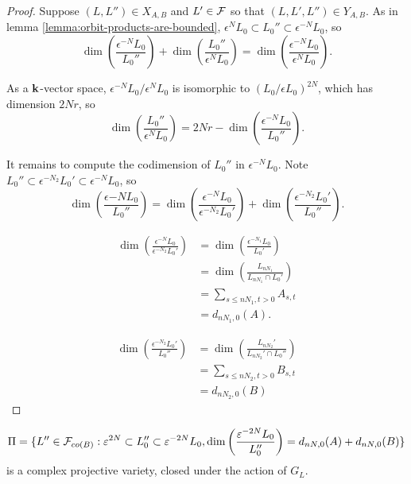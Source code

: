 \documentclass[a4paper, 11pt]{report}
\begin{document}
\begin{proof}
Suppose $(L,L'')\in X_{A,B}$ and $L'\in\mathcal{F}$ so that $(L,L',L'')\in Y_{A,B}$. As in lemma \ref{lemma:orbit-products-are-bounded}, $\epsilon^N L_0\subset L_0''\subset \epsilon^{-N}L_0$, so
\begin{equation*}
\dim\left(\frac{\epsilon^{-N}L_0}{L_0''}\right) + \dim\left(\frac{L_0''}{\epsilon^N L_0}\right) = \dim\left(\frac{\epsilon^{-N}L_0}{\epsilon^N L_0}\right).
\end{equation*}

As a $\mathbf{k}$-vector space, $\epsilon^{-N}L_0/\epsilon^N L_0$ is isomorphic to $(L_0/{\epsilon L_0})^{2N}$, which has dimension $2Nr$, so
\begin{equation*}
\dim\left(\frac{L_0''}{\epsilon^N L_0}\right) = 2Nr - \dim\left(\frac{\epsilon^{-N}L_0}{L_0''}\right).
\end{equation*}

It remains to compute the codimension of $L_0''$ in $\epsilon^{-N}L_0$. Note $L_0''\subset \epsilon^{-N_2}L_0'\subset \epsilon^{-N} L_0$, so
\begin{equation*}
\dim\left(\frac{\epsilon{-N}L_0}{L_0''}\right) = \dim\left(\frac{\epsilon^{-N}L_0}{\epsilon^{-N_2}L_0'}\right) + \dim\left(\frac{\epsilon^{-N_2}L_0'}{L_0''}\right).
\end{equation*}

\begin{align*}
\dim\left(\frac{\epsilon^{-N}L_0}{\epsilon^{-N_2}L_0'}\right)
&= \dim\left(\frac{\epsilon^{-N_1}L_0}{L_0'}\right)\\
&= \dim\left(\frac{L_{nN_1}}{L_{nN_1}\cap L_0'}\right)\\
&= \sum_{s\le nN_1, t>0} A_{s,t}\\
&= d_{nN_1,0}(A).
\end{align*}

\begin{align*}
\dim\left(\frac{\epsilon^{-N_2}L_0'}{L_0''}\right)
&= \dim\left(\frac{ L_{nN_2}'}{L_{nN_2}'\cap L_0''}\right)\\
&= \sum_{s\le nN_2, t>0} B_{s,t}\\
&= d_{nN_2,0}(B)
\end{align*}
\end{proof}


\begin{lemma}
\begin{equation*}
\Pi  =\{L''\in\mathcal{F}_{co(B)}:\varepsilon^{2N}\subset L_0''\subset\varepsilon^{-2N}L_0, \dim\left(\frac{\varepsilon^{-2N}L_0}{L_0''}\right) = d_{nN,0}(A)+ d_{nN,0}(B)\}
\end{equation*}
is a complex projective variety, closed under the action of $G_L$.
\end{lemma}
\end{document}
